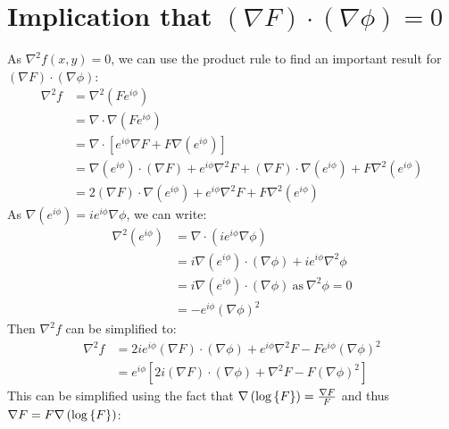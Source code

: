 \documentclass{article}
\begin{document}
\section{Implication that $\left(\nabla F\right) \cdot \left( \nabla \phi \right) = 0$}

As $\nabla^2 f(x,y) = 0$, we can use the product rule to find an important
result for $\left(\nabla F\right) \cdot \left(\nabla \phi\right)$:
\begin{align}
    \nabla^2 f &= \nabla^2 \left( F e^{i \phi} \right) \\
               &= \nabla \cdot \nabla \left( F e^{i \phi} \right) \\
               &= \nabla \cdot \left[ e^{i \phi} \nabla F + F \nabla \left( e^{i \phi} \right)
                  \right] \\
               &= \nabla \left( e^{i \phi} \right) \cdot (\nabla F) + e^{i \phi}
                  \nabla^2 F + \left( \nabla F \right) \cdot \nabla \left( e^{i \phi} \right)
                  + F \nabla^2 \left( e^{i \phi} \right) \\
               &= 2 \left( \nabla F \right) \cdot \nabla \left( e^{i \phi}
                  \right) + e^{i \phi} \nabla^2 F + F \nabla^2 \left( e^{i \phi}
                  \right)
\end{align}
As $\nabla \left( e^{i \phi} \right) = i e^{i \phi} \nabla \phi$, we can write:
\begin{align}
    \nabla^2 \left( e^{i \phi} \right) &= \nabla \cdot \left(i e^{i \phi} \nabla
        \phi \right) \\
    &= i \nabla \left( e^{i \phi} \right) \cdot (\nabla \phi) + i e^{i \phi}
        \nabla^2 \phi \\
    &= i \nabla \left( e^{i \phi} \right) \cdot (\nabla \phi) ~\textrm{as}~
        \nabla^2 \phi = 0 \\
    &= - e^{i \phi} \left( \nabla \phi \right)^2
\end{align}
Then $\nabla^2 f$ can be simplified to:
\begin{align}
    \nabla^2 f &= 2i e^{i \phi} \left( \nabla F \right) \cdot \left( \nabla \phi
        \right) + e^{i \phi} \nabla^2 F - F e^{i \phi} \left( \nabla \phi \right)^2 \\
    &= e^{i \phi} \left[ 2i (\nabla F) \cdot (\nabla \phi) + \nabla^2 F - F
        \left( \nabla \phi \right)^2 \right]
\end{align}
This can be simplified using the fact that $\nabla \left( \log \left\{ F \right\} \right) =
\frac{\nabla F}{F}$ and thus $\nabla F = F \nabla \left( \log \left\{ F \right\} \right)$:
\end{document}
